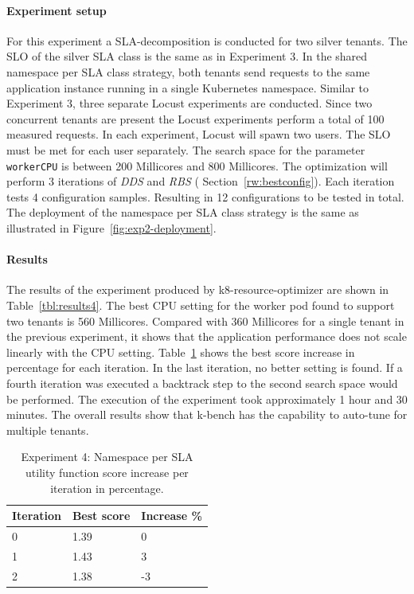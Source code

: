 \paragraph{Experiment setup}
For this experiment a SLA-decomposition is conducted for two silver tenants. The SLO of the silver SLA class is the same as in Experiment 3. In the shared namespace per SLA class strategy, both tenants send requests to the same application instance running in a single Kubernetes namespace.  Similar to Experiment 3,  three separate Locust experiments are conducted. Since two concurrent tenants are present the Locust experiments perform a total of 100 measured requests. In each experiment, Locust will spawn two users. The SLO must be met for each user separately.  The search space for the parameter \texttt{workerCPU} is between 200 Millicores and 800 Millicores. The optimization will perform 3 iterations of \textit{DDS} and \textit{RBS} ( Section~\ref{rw:bestconfig}). Each iteration tests 4 configuration samples. Resulting in  12 configurations to be tested in total.  The deployment of the namespace per SLA class strategy is the same as illustrated in Figure~\ref{fig:exp2-deployment}. 

\paragraph{Results}
The results of the experiment produced by k8-resource-optimizer are shown in Table~\ref{tbl:results4}.  The best CPU setting for the worker pod found to support two tenants is 560 Millicores. Compared with 360 Millicores for a single tenant in  the previous experiment, it shows that the application performance does not scale linearly with the CPU setting. Table~\ref{tbl:exp4-increase} shows the best score increase in percentage for each iteration. In the last iteration, no better setting is found. If a fourth iteration was executed a backtrack step to the second search space would be performed. The execution of the experiment took approximately 1 hour and 30 minutes. The overall results show that k-bench has the capability to auto-tune for multiple tenants.
\begin{table}[H]
\centering
\caption{Experiment 4: Namespace per SLA utility function score increase per iteration in percentage.}
\label{tbl:exp4-increase}
\begin{tabular}{|l|l|l|}
\hline
\textbf{Iteration} & \textbf{Best score} & \textbf{Increase \%} \\ \hline
0                  & 1.39                & 0                    \\ \hline
1                  & 1.43                & 3                    \\ \hline
2                  & 1.38                & -3                   \\ \hline
\end{tabular}
\end{table}

